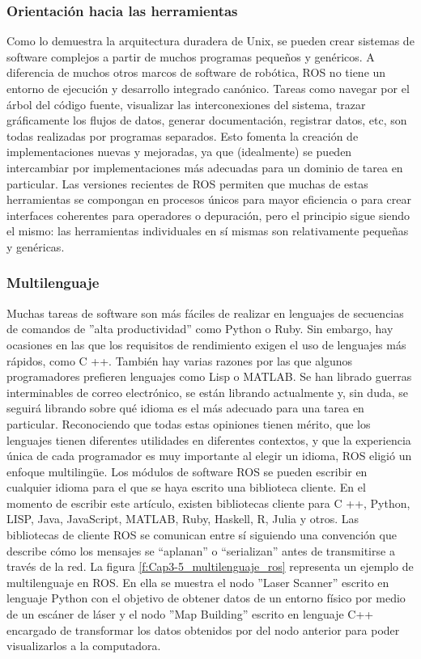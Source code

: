         \subsubsection{Orientación hacia las herramientas}
        
            Como lo demuestra la arquitectura duradera de Unix, se pueden crear sistemas de software complejos a partir de muchos programas pequeños y genéricos. A diferencia de muchos otros marcos de software de robótica, ROS no tiene un entorno de ejecución y desarrollo integrado canónico. Tareas como navegar por el árbol del código fuente, visualizar las interconexiones del sistema, trazar gráficamente los flujos de datos, generar documentación, registrar datos, etc, son todas realizadas por programas separados. Esto fomenta la creación de implementaciones nuevas y mejoradas, ya que (idealmente) se pueden intercambiar por implementaciones más adecuadas para un dominio de tarea en particular. Las versiones recientes de ROS permiten que muchas de estas herramientas se compongan en procesos únicos para mayor eficiencia o para crear interfaces coherentes para operadores o depuración, pero el principio sigue siendo el mismo: las herramientas individuales en sí mismas son relativamente pequeñas y genéricas.
            
        \subsubsection{Multilenguaje}
        
            Muchas tareas de software son más fáciles de realizar en lenguajes de secuencias de comandos de ''alta productividad'' como Python o Ruby. Sin embargo, hay ocasiones en las que los requisitos de rendimiento exigen el uso de lenguajes más rápidos, como C ++. También hay varias razones por las que algunos programadores prefieren lenguajes como Lisp o MATLAB. Se han librado guerras interminables de correo electrónico, se están librando actualmente y, sin duda, se seguirá librando sobre qué idioma es el más adecuado para una tarea en particular. Reconociendo que todas estas opiniones tienen mérito, que los lenguajes tienen diferentes utilidades en diferentes contextos, y que la experiencia única de cada programador es muy importante al elegir un idioma, ROS eligió un enfoque multilingüe. Los módulos de software ROS se pueden escribir en cualquier idioma para el que se haya escrito una biblioteca cliente. En el momento de escribir este artículo, existen bibliotecas cliente para C ++, Python, LISP, Java, JavaScript, MATLAB, Ruby, Haskell, R, Julia y otros. Las bibliotecas de cliente ROS se comunican entre sí siguiendo una convención que describe cómo los mensajes se ``aplanan'' o ``serializan'' antes de transmitirse a través de la red. La figura \eqref{f:Cap3-5_multilenguaje_ros} representa un ejemplo de multilenguaje en ROS. En ella se muestra el nodo ''Laser Scanner'' escrito en lenguaje Python con el objetivo de obtener datos de un entorno físico por medio de un escáner de láser y el nodo ''Map Building'' escrito en lenguaje C++ encargado de transformar los datos obtenidos por del nodo anterior para poder visualizarlos a la computadora.     
            
